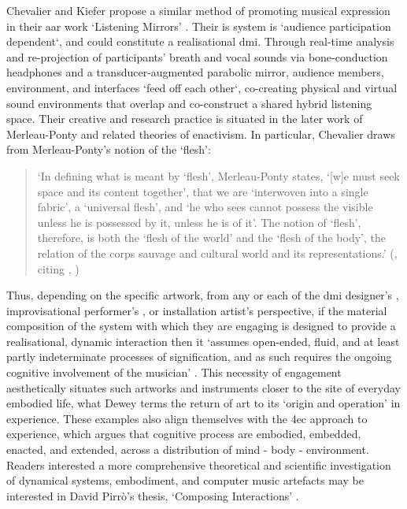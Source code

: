 Chevalier and Kiefer propose a similar method of promoting musical expression in their \gls{aar} work `Listening Mirrors' \citeyearpar[]{chevalier2018}. Their is system is `audience participation dependent`, and could constitute a realisational \gls{dmi}. Through real-time analysis and re-projection of participants' breath and vocal sounds via bone-conduction headphones and a transducer-augmented parabolic mirror, audience members, environment, and interfaces `feed off each other`, co-creating physical and virtual sound environments that overlap and co-construct a shared hybrid listening space. Their creative and research practice is situated in the later work of Merleau-Ponty and related theories of enactivism. In particular, Chevalier draws from Merleau-Ponty's notion of the `flesh':
\begin{quote}
    `In defining what is meant by `flesh', Merleau-Ponty states, `[w]e must seek space and its content together', that we are `interwoven into a single fabric', a `universal flesh', and `he who sees cannot possess the visible unless he is possessed by it, unless he is of it'. The notion of `flesh', therefore, is both the `flesh of the world' and the `flesh of the body', the relation of the corps sauvage and cultural world and its representations.' (\citeauthor[p. 58]{chevalier2016}, \citeyearpar{chevalier2016}  citing \citeauthor{merleau-ponty1945}, \citeyearpar{merleau-ponty1945,merleau-ponty1968})
\end{quote}

Thus, depending on the specific artwork, from any or each of the \gls{dmi} designer's \citep[]{essl2006,armstrong2006}, improvisational performer's \citep[]{hayes2019}, or installation artist's \citep[]{chevalier2018} perspective, if the material composition of the system with which they are engaging is designed to provide a realisational, dynamic interaction then it `assumes open-ended, fluid, and at least partly indeterminate processes of signification, and as such requires the ongoing cognitive involvement of the musician' \citep[p. 48]{armstrong2006}. This necessity of engagement aesthetically situates such artworks and instruments closer to the site of everyday embodied life, what Dewey terms the return of art to its `origin and operation' in experience. These examples also align themselves with the \gls{4ec} approach to experience, which argues that cognitive process are embodied, embedded, enacted, and extended, across a distribution of mind - body - environment. Readers interested a more comprehensive theoretical and scientific investigation of dynamical systems, embodiment, and computer music artefacts may be interested in David Pirr\`o's thesis, `Composing Interactions' \citeyearpar{pirro2017}.

